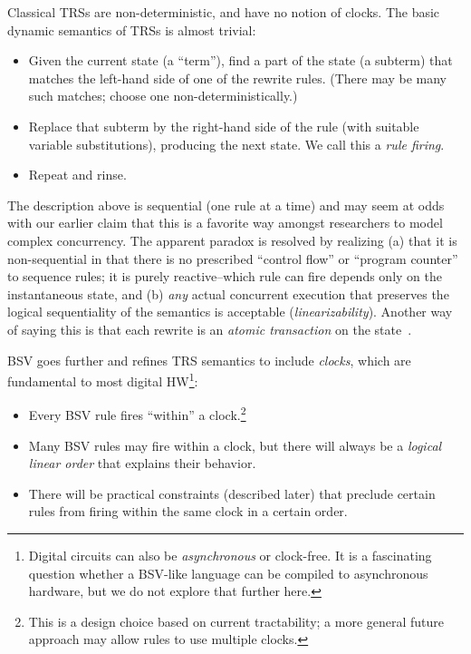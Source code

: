 \documentclass[11pt]{article}
\begin{document}
Classical TRSs are non-deterministic, and have no notion of clocks.
The basic dynamic semantics of TRSs is almost trivial:
\begin{itemize}

\item Given the current state (a ``term''), find a part of the state
(a subterm) that matches the left-hand side of one of the rewrite
rules.  (There may be many such matches; choose one non-deterministically.)

\item Replace that subterm by the right-hand side of the rule (with
suitable variable substitutions), producing the next state.  We call
this a \emph{rule firing}.

\item Repeat and rinse.

\end{itemize}

\noindent The description above is sequential (one rule at a time) and
may seem at odds with our earlier claim that this is a favorite way
amongst researchers to model complex concurrency.  The apparent
paradox is resolved by realizing (a) that it is non-sequential in that
there is no prescribed ``control flow'' or ``program counter'' to
sequence rules; it is purely reactive--which rule can fire depends
only on the instantaneous state, and (b) \emph{any} actual concurrent
execution that preserves the logical sequentiality of the semantics is
acceptable (\emph{linearizability}).  Another way of saying this is
that each rewrite is an \emph{atomic transaction} on the
state~\cite{Lampson81}.

BSV goes further and refines TRS semantics to include \emph{clocks},
which are fundamental to most digital HW\footnote{Digital circuits can
also be \emph{asynchronous} or clock-free.  It is a fascinating
question whether a BSV-like language can be compiled to asynchronous
hardware, but we do not explore that further here.}:

\begin{itemize}

\item Every BSV rule fires ``within'' a clock.\footnote{This is a
design choice based on current tractability; a more general future
approach may allow rules to use multiple clocks.}

\item Many BSV rules may fire within a clock, but there will always be
a \emph{logical linear order} that explains their behavior.

\item There will be practical constraints (described later) that
preclude certain rules from firing within the same clock in a certain
order.

\end{itemize}
\end{document}
